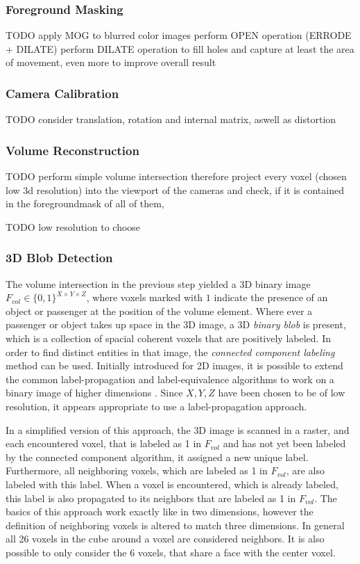 \subsubsection{Foreground Masking}
TODO apply MOG to blurred color images
perform OPEN operation (ERRODE + DILATE)
perform DILATE operation to fill holes and capture at least the area of movement, even more to improve overall result

\subsubsection{Camera Calibration}
TODO
consider translation, rotation and internal matrix, aswell as distortion

\subsubsection{Volume Reconstruction}
TODO
perform simple volume intersection
therefore project every voxel (chosen low 3d resolution)
into the viewport of the cameras and check, if it is contained in the foregroundmask of all of them,

TODO low resolution to choose

\subsubsection{3D Blob Detection}

The volume intersection in the previous step yielded a \ac{3D} binary image \\
$ F_{vol} \in \{0, 1\}^{X \times Y \times Z}$, where voxels marked with $ 1 $ indicate the presence of an object or passenger at the position of the volume element.
Where ever a passenger or object takes up space in the \ac{3D} image, a \ac{3D} \emph{binary blob} is present, which is a collection of spacial coherent voxels that are positively labeled.
In order to find distinct entities in that image, the \emph{connected component labeling} method can be used.
Initially introduced for \ac{2D} images, it is possible to extend 
the common label-propagation and label-equivalence algorithms to work on a binary image of higher dimensions
\autocite[][p.~39]{he2017connected}.
Since $ X, Y, Z $ have been chosen to be of low resolution, it appears appropriate to use a label-propagation approach.

In a simplified version of this approach, the \ac{3D} image is scanned in a raster, 
and each encountered voxel, that is labeled as 1 in $ F_{vol} $ and has not yet been labeled by the connected component algorithm, it assigned a new unique label.
Furthermore, all neighboring voxels, which are labeled as 1 in $ F_{vol} $, are also labeled with this label.
When a voxel is encountered, which is already labeled, this label is also propagated to its neighbors that are labeled as 1 in $ F_{vol} $. 
The basics of this approach work exactly like in two dimensions, however the definition of neighboring voxels is altered to match three dimensions. 
In general all 26 voxels in the cube around a voxel are considered neighbors.
It is also possible to only consider the 6 voxels, that share a face with the center voxel.

